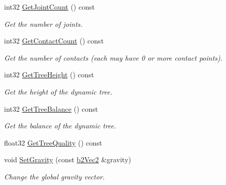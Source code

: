 \begin{DoxyCompactItemize}
\mbox{\label{classb2World_a98bd6ca53dbc376f210beced33901934}} 
int32 \hyperlink{classb2World_a98bd6ca53dbc376f210beced33901934}{Get\+Joint\+Count} () const
\begin{DoxyCompactList}\small\item\em Get the number of joints. \end{DoxyCompactList}\item 
\mbox{\label{classb2World_aa47375fc3ca9f09d0350c61cfeabcee9}} 
int32 \hyperlink{classb2World_aa47375fc3ca9f09d0350c61cfeabcee9}{Get\+Contact\+Count} () const
\begin{DoxyCompactList}\small\item\em Get the number of contacts (each may have 0 or more contact points). \end{DoxyCompactList}\item 
\mbox{\label{classb2World_abc99b2beb6ba79ac6c80f33bac264b52}} 
int32 \hyperlink{classb2World_abc99b2beb6ba79ac6c80f33bac264b52}{Get\+Tree\+Height} () const
\begin{DoxyCompactList}\small\item\em Get the height of the dynamic tree. \end{DoxyCompactList}\item 
\mbox{\label{classb2World_aaca027331f06d93d978b44e065873f80}} 
int32 \hyperlink{classb2World_aaca027331f06d93d978b44e065873f80}{Get\+Tree\+Balance} () const
\begin{DoxyCompactList}\small\item\em Get the balance of the dynamic tree. \end{DoxyCompactList}\item 
float32 \hyperlink{classb2World_a562935b3b8161dd18a467e02f479e88a}{Get\+Tree\+Quality} () const
\item 
\mbox{\label{classb2World_aeafa43d6580e1dddb0675e672ca2375c}} 
void \hyperlink{classb2World_aeafa43d6580e1dddb0675e672ca2375c}{Set\+Gravity} (const \hyperlink{structb2Vec2}{b2\+Vec2} \&gravity)
\begin{DoxyCompactList}\small\item\em Change the global gravity vector. \end{DoxyCompactList}\item 
\mbox{\label{classb2World_abd41cdde8eaa3d1c58d2f00eaf688ec3}} 

\end{DoxyCompactItemize}

